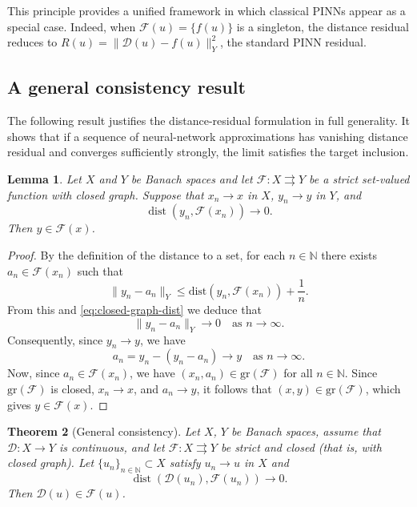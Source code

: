\documentclass[11pt]{elsarticle}
\newtheorem{theorem}{Theorem}[section]
\newtheorem{lemma}[theorem]{Lemma}
\theoremstyle{definition}
\theoremstyle{remark}
\numberwithin{equation}{section}
\def\dist{\operatorname{dist}}
\begin{document}
	This principle provides a unified framework in which classical PINNs
	appear as a special case.  Indeed, when $\mathcal{F}(u)=\{f(u)\}$ is a
	singleton, the distance residual reduces to
	$R(u)=\|\mathcal{D}(u)-f(u)\|_Y^2$, the standard PINN residual.
	
	\subsection{A general consistency result}
	
	The following result justifies the distance-residual formulation in full
	generality.  It shows that if a sequence of neural-network approximations
	has vanishing distance residual and converges sufficiently strongly, the
	limit satisfies the target inclusion.
	
	\begin{lemma}\label{lem:closed-graph}
		Let $X$ and $Y$ be Banach spaces and let $\mathcal{F}: X \rightrightarrows Y$ be a strict set-valued function with closed graph.
		Suppose that $x_n \to x$ in $X$, $y_n \to y$ in $Y$, and 
		\begin{equation} \label{eq:closed-graph-dist}
			\dist(y_n, \mathcal{F}(x_n)) \to 0.
		\end{equation}
		Then $y \in \mathcal{F}(x)$.
	\end{lemma}
	
	\begin{proof}
		By the definition of the distance to a set,
		for each $n \in \mathbb{N}$ there exists $a_n \in \mathcal{F}(x_n)$ such that
		$$
		\|y_n - a_n\|_Y \leq \text{dist}(y_n, \mathcal{F}(x_n)) + \frac{1}{n}.
		$$
		From this and \eqref{eq:closed-graph-dist} we deduce that
		\[
		\|y_n - a_n\|_Y \to 0 \quad \text{as } n \to \infty.
		\]
		Consequently, since $y_n \to y$, we have 
		\[
		a_n = y_n - (y_n - a_n) \to y \quad \text{as } n \to \infty.
		\]
		Now, since $a_n \in \mathcal{F}(x_n)$, we have $(x_n, a_n) \in \text{gr}(\mathcal{F})$ for all $n\in\mathbb{N}$.
		Since $\text{gr}(\mathcal{F})$ is closed, $x_n \to x$, and $a_n \to y$, it follows that $(x, y) \in \text{gr}(\mathcal{F})$, 
		which gives $y \in \mathcal{F}(x)$.
	\end{proof}
	
	\begin{theorem}[General consistency]\label{thm:general-consistency}
		Let $X$, $Y$ be Banach spaces, assume that $\mathcal{D}:X\to Y$ is continuous,
		and let $\mathcal{F}:X\rightrightarrows Y$ be strict and closed (that is, with closed graph).
		Let $\{u_n\}_{n\in\mathbb{N}}\subset X$ satisfy $u_n\to u$ in $X$ and
		\[
		\dist(\mathcal{D}(u_n),\mathcal{F}(u_n))\to 0.
		\]
		Then
		$\mathcal{D}(u)\in\mathcal{F}(u)$.
	\end{theorem}
	
\end{document}
